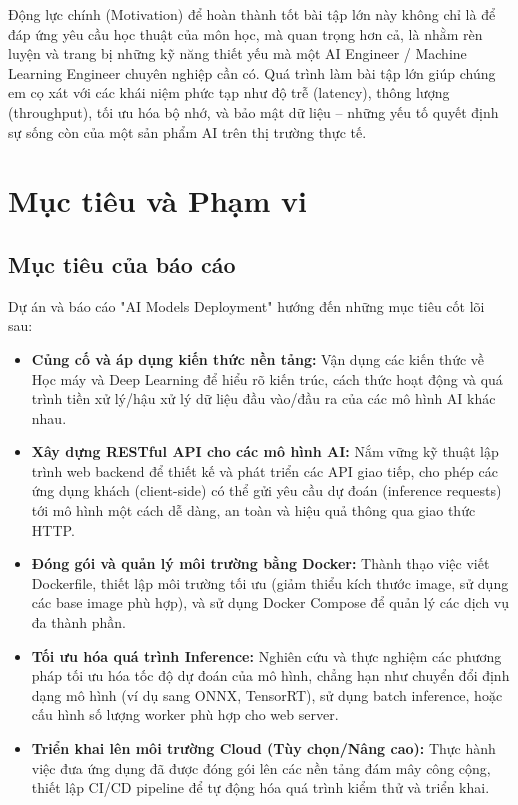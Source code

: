 \documentclass[12pt,a4paper]{article}
\begin{document}
Động lực chính (Motivation) để hoàn thành tốt bài tập lớn này không chỉ là để đáp ứng yêu cầu học thuật của môn học, mà quan trọng hơn cả, là nhằm rèn luyện và trang bị những kỹ năng thiết yếu mà một AI Engineer / Machine Learning Engineer chuyên nghiệp cần có. Quá trình làm bài tập lớn giúp chúng em cọ xát với các khái niệm phức tạp như độ trễ (latency), thông lượng (throughput), tối ưu hóa bộ nhớ, và bảo mật dữ liệu – những yếu tố quyết định sự sống còn của một sản phẩm AI trên thị trường thực tế.

\newpage
\section{Mục tiêu và Phạm vi}

\subsection{Mục tiêu của báo cáo}

Dự án và báo cáo "AI Models Deployment" hướng đến những mục tiêu cốt lõi sau:
\begin{itemize}
    \item \textbf{Củng cố và áp dụng kiến thức nền tảng:} Vận dụng các kiến thức về Học máy và Deep Learning để hiểu rõ kiến trúc, cách thức hoạt động và quá trình tiền xử lý/hậu xử lý dữ liệu đầu vào/đầu ra của các mô hình AI khác nhau.
    \item \textbf{Xây dựng RESTful API cho các mô hình AI:} Nắm vững kỹ thuật lập trình web backend để thiết kế và phát triển các API giao tiếp, cho phép các ứng dụng khách (client-side) có thể gửi yêu cầu dự đoán (inference requests) tới mô hình một cách dễ dàng, an toàn và hiệu quả thông qua giao thức HTTP.
    \item \textbf{Đóng gói và quản lý môi trường bằng Docker:} Thành thạo việc viết Dockerfile, thiết lập môi trường tối ưu (giảm thiểu kích thước image, sử dụng các base image phù hợp), và sử dụng Docker Compose để quản lý các dịch vụ đa thành phần.
    \item \textbf{Tối ưu hóa quá trình Inference:} Nghiên cứu và thực nghiệm các phương pháp tối ưu hóa tốc độ dự đoán của mô hình, chẳng hạn như chuyển đổi định dạng mô hình (ví dụ sang ONNX, TensorRT), sử dụng batch inference, hoặc cấu hình số lượng worker phù hợp cho web server.
    \item \textbf{Triển khai lên môi trường Cloud (Tùy chọn/Nâng cao):} Thực hành việc đưa ứng dụng đã được đóng gói lên các nền tảng đám mây công cộng, thiết lập CI/CD pipeline để tự động hóa quá trình kiểm thử và triển khai.
\end{itemize}
\end{document}
